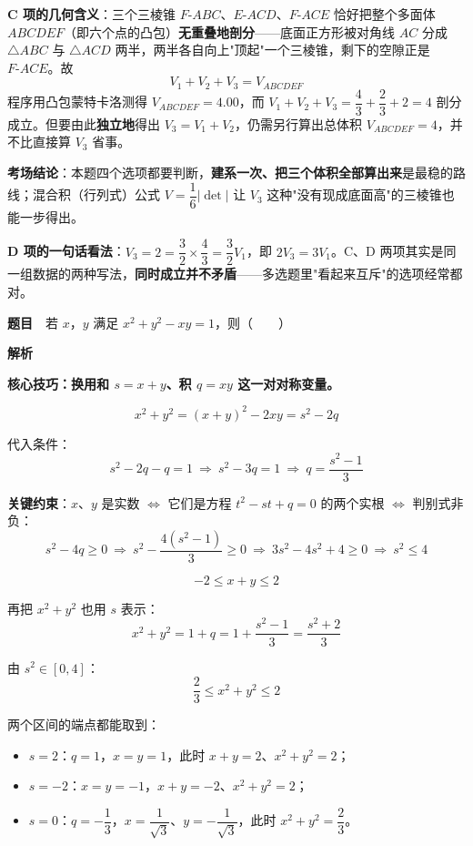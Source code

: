 
\begin{gktip}
\textbf{C 项的几何含义}：三个三棱锥 $F\text{-}ABC$、$E\text{-}ACD$、$F\text{-}ACE$ 恰好把整个多面体 $ABCDEF$（即六个点的凸包）\textbf{无重叠地剖分}——底面正方形被对角线 $AC$ 分成 $\triangle ABC$ 与 $\triangle ACD$ 两半，两半各自向上"顶起"一个三棱锥，剩下的空隙正是 $F\text{-}ACE$。故
\[V_1+V_2+V_3=V_{ABCDEF}\]
程序用凸包蒙特卡洛测得 $V_{ABCDEF}=4.00$，而 $V_1+V_2+V_3=\dfrac43+\dfrac23+2=4$  剖分成立。但要由此\textbf{独立地}得出 $V_3=V_1+V_2$，仍需另行算出总体积 $V_{ABCDEF}=4$，并不比直接算 $V_3$ 省事。

\textbf{考场结论}：本题四个选项都要判断，\textbf{建系一次、把三个体积全部算出来}是最稳的路线；混合积（行列式）公式 $V=\dfrac16\left|\det\right|$ 让 $V_3$ 这种"没有现成底面高"的三棱锥也能一步得出。

\textbf{D 项的一句话看法}：$V_3=2=\dfrac32\times\dfrac43=\dfrac32V_1$，即 $2V_3=3V_1$。C、D 两项其实是同一组数据的两种写法，\textbf{同时成立并不矛盾}——多选题里"看起来互斥"的选项经常都对。
\end{gktip}

\par\medskip


\textbf{题目}　若 $x$，$y$ 满足 $x^{2}+y^{2}-xy=1$，则（　　）

\textbf{解析}

\textbf{核心技巧：换用和 $s=x+y$、积 $q=xy$ 这一对对称变量。}

\[x^{2}+y^{2}=(x+y)^{2}-2xy=s^{2}-2q\]

代入条件：
\[s^{2}-2q-q=1\ \Longrightarrow\ s^{2}-3q=1\ \Longrightarrow\ q=\frac{s^{2}-1}3\]

\textbf{关键约束}：$x$、$y$ 是实数 $\Leftrightarrow$ 它们是方程 $t^{2}-st+q=0$ 的两个实根 $\Leftrightarrow$ 判别式非负：
\[s^{2}-4q\ge0\ \Longrightarrow\ s^{2}-\frac{4\left(s^{2}-1\right)}3\ge0\ \Longrightarrow\ 3s^{2}-4s^{2}+4\ge0\ \Longrightarrow\ s^{2}\le4\]

\[\boxed{-2\le x+y\le2}\]

再把 $x^{2}+y^{2}$ 也用 $s$ 表示：
\[x^{2}+y^{2}=1+q=1+\frac{s^{2}-1}3=\frac{s^{2}+2}3\]

由 $s^{2}\in[0,4]$：
\[\boxed{\frac23\le x^{2}+y^{2}\le2}\]

两个区间的端点都能取到：

\begin{itemize}
\item $s=2$：$q=1$，$x=y=1$，此时 $x+y=2$、$x^{2}+y^{2}=2$；
\item $s=-2$：$x=y=-1$，$x+y=-2$、$x^{2}+y^{2}=2$；
\item $s=0$：$q=-\dfrac13$，$x=\dfrac1{\sqrt3}$、$y=-\dfrac1{\sqrt3}$，此时 $x^{2}+y^{2}=\dfrac23$。
\end{itemize}

